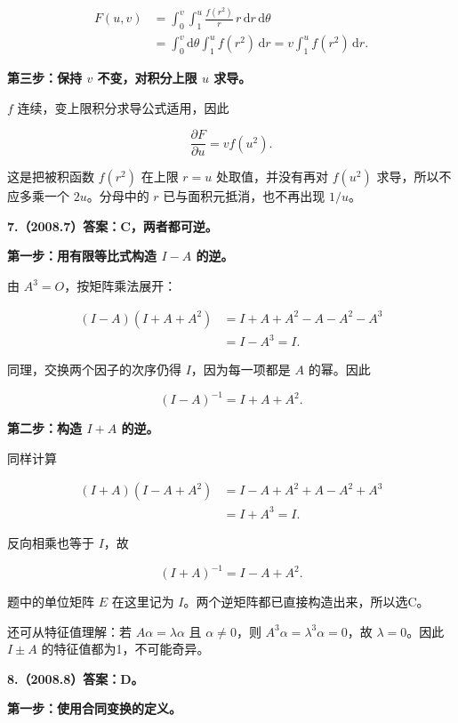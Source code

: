 \documentclass[UTF8,11pt,fontset=windows]{ctexart}
\begin{document}
$$
\begin{aligned}
F(u,v)&=\int_0^v\int_1^u\frac{f(r^2)}r\,r\,\mathrm dr\,\mathrm d\theta\\
&=\int_0^v\mathrm d\theta\int_1^u f(r^2)\,\mathrm dr
=v\int_1^u f(r^2)\,\mathrm dr.
\end{aligned}
$$

\textbf{第三步：保持 $v$ 不变，对积分上限 $u$ 求导。}

$f$ 连续，变上限积分求导公式适用，因此

$$
\boxed{\frac{\partial F}{\partial u}=vf(u^2)}.
$$

这是把被积函数 $f(r^2)$ 在上限 $r=u$ 处取值，并没有再对 $f(u^2)$ 求导，所以不应多乘一个 $2u$。分母中的 $r$ 已与面积元抵消，也不再出现 $1/u$。

\clearpage

\textbf{7.（2008.7）答案：C，两者都可逆。}

\textbf{第一步：用有限等比式构造 $I-A$ 的逆。}

由 $A^3=O$，按矩阵乘法展开：

$$
\begin{aligned}
(I-A)(I+A+A^2)
&=I+A+A^2-A-A^2-A^3\\
&=I-A^3=I.
\end{aligned}
$$

同理，交换两个因子的次序仍得 $I$，因为每一项都是 $A$ 的幂。因此

$$
\boxed{(I-A)^{-1}=I+A+A^2}.
$$

\textbf{第二步：构造 $I+A$ 的逆。}

同样计算

$$
\begin{aligned}
(I+A)(I-A+A^2)
&=I-A+A^2+A-A^2+A^3\\
&=I+A^3=I.
\end{aligned}
$$

反向相乘也等于 $I$，故

$$
\boxed{(I+A)^{-1}=I-A+A^2}.
$$

题中的单位矩阵 $E$ 在这里记为 $I$。两个逆矩阵都已直接构造出来，所以选C。

还可从特征值理解：若 $A\alpha=\lambda\alpha$ 且 $\alpha\ne0$，则 $A^3\alpha=\lambda^3\alpha=0$，故 $\lambda=0$。因此 $I\pm A$ 的特征值都为1，不可能奇异。

\clearpage

\textbf{8.（2008.8）答案：D。}

\textbf{第一步：使用合同变换的定义。}
\end{document}
